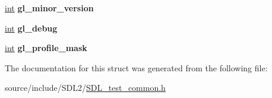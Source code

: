 \begin{DoxyCompactItemize}
\item 
\hypertarget{struct_s_d_l_test___common_state_a5a50c65004454c791da21a3473388608}{}\hyperlink{_s_d_l__thread_8h_a6a64f9be4433e4de6e2f2f548cf3c08e}{int} {\bfseries gl\+\_\+minor\+\_\+version}\label{struct_s_d_l_test___common_state_a5a50c65004454c791da21a3473388608}

\item 
\hypertarget{struct_s_d_l_test___common_state_a2710657ef2a0c8aabebc5fceb01c71b5}{}\hyperlink{_s_d_l__thread_8h_a6a64f9be4433e4de6e2f2f548cf3c08e}{int} {\bfseries gl\+\_\+debug}\label{struct_s_d_l_test___common_state_a2710657ef2a0c8aabebc5fceb01c71b5}

\item 
\hypertarget{struct_s_d_l_test___common_state_aa923ff5f227c35523a4e491863a7d907}{}\hyperlink{_s_d_l__thread_8h_a6a64f9be4433e4de6e2f2f548cf3c08e}{int} {\bfseries gl\+\_\+profile\+\_\+mask}\label{struct_s_d_l_test___common_state_aa923ff5f227c35523a4e491863a7d907}

\end{DoxyCompactItemize}


The documentation for this struct was generated from the following file\+:\begin{DoxyCompactItemize}
\item 
source/include/\+S\+D\+L2/\hyperlink{_s_d_l__test__common_8h}{S\+D\+L\+\_\+test\+\_\+common.\+h}\end{DoxyCompactItemize}
